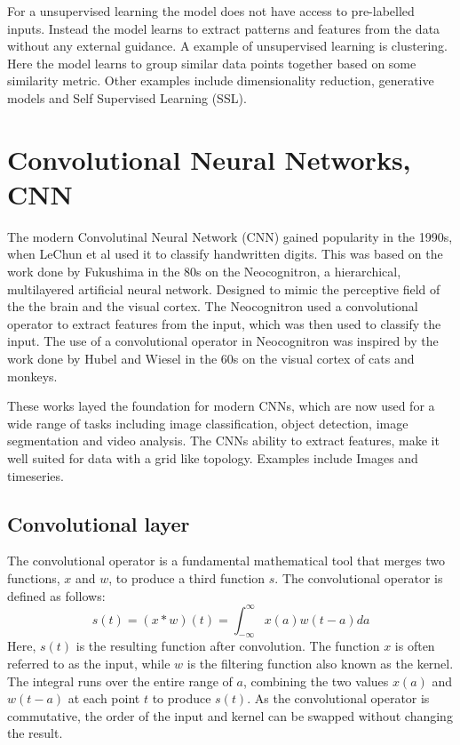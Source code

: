 For a unsupervised learning the model does not have access to pre-labelled inputs. Instead the model learns to extract patterns and features from the data without any external guidance.
A example of unsupervised learning is clustering. Here the model learns to group similar data points together based on some similarity metric. Other examples include dimensionality reduction, generative models and Self Supervised Learning (SSL).

\section{Convolutional Neural Networks, CNN}


The modern Convolutinal Neural Network (CNN) gained popularity in the 1990s, when LeChun et al\cite{LeChun} used it to classify handwritten digits. This was based on the work done by Fukushima in the 80s\cite{Fukushima} on the Neocognitron, a hierarchical, multilayered artificial neural network.
Designed to mimic the perceptive field of the the brain and the visual cortex. The Neocognitron used a convolutional operator to extract features from the input, which was then used to classify the input.
The use of a convolutional operator in Neocognitron was inspired by the work done by Hubel and Wiesel in the 60s\cite{HubelWiesel} on the visual cortex of cats and monkeys.

These works layed the foundation for modern CNNs, which are now used for a wide range of tasks including image classification, object detection, image segmentation and video analysis. 
The CNNs ability to extract features, make it well suited for data with a grid like topology. Examples include Images and timeseries. 

\subsection{Convolutional layer}
The convolutional operator is a fundamental mathematical tool that merges two functions, $x$ and $w$, to produce a third function $s$. The convolutional operator is defined as follows:
\begin{equation}
    s(t) = (x*w)(t) = \int_{-\infty}^\infty x(a)w(t-a)d a
\end{equation}
Here, $s(t)$ is the resulting function after convolution. The function $x$ is often referred to as the input, while $w$ is the filtering function also known as the kernel.
The integral runs over the entire range of $a$, combining the two values $x(a)$ and $w(t-a)$ at each point $t$ to produce $s(t)$.
As the convolutional operator is commutative, the order of the input and kernel can be swapped without changing the result.

